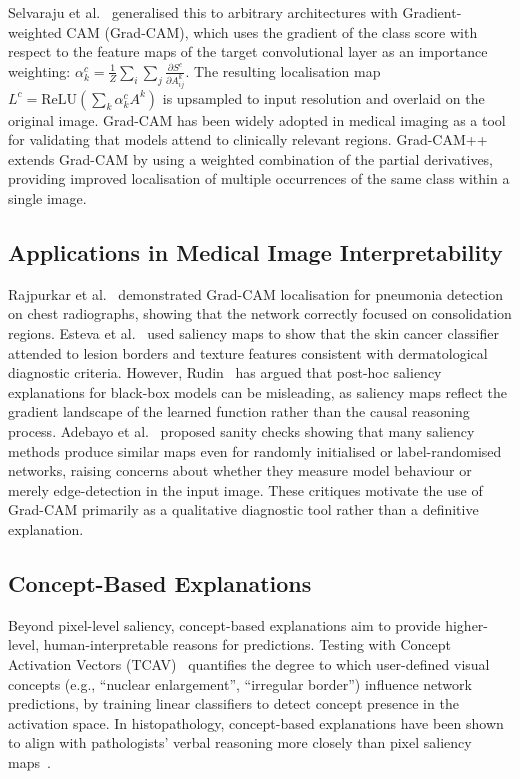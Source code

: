 Selvaraju et al.~\cite{selvaraju2017grad} generalised this to arbitrary architectures with Gradient-weighted CAM (Grad-CAM), which uses the gradient of the class score with respect to the feature maps of the target convolutional layer as an importance weighting: $\alpha_k^c = \frac{1}{Z}\sum_i \sum_j \frac{\partial S^c}{\partial A_{ij}^k}$. The resulting localisation map $L^c = \text{ReLU}\left(\sum_k \alpha_k^c A^k\right)$ is upsampled to input resolution and overlaid on the original image. Grad-CAM has been widely adopted in medical imaging as a tool for validating that models attend to clinically relevant regions. Grad-CAM++ \cite{chattopadhay2018grad} extends Grad-CAM by using a weighted combination of the partial derivatives, providing improved localisation of multiple occurrences of the same class within a single image.

\subsection{Applications in Medical Image Interpretability}

Rajpurkar et al.~\cite{rajpurkar2017chexnet} demonstrated Grad-CAM localisation for pneumonia detection on chest radiographs, showing that the network correctly focused on consolidation regions. Esteva et al.~\cite{esteva2017dermatologist} used saliency maps to show that the skin cancer classifier attended to lesion borders and texture features consistent with dermatological diagnostic criteria. However, Rudin~\cite{rudin2019stop} has argued that post-hoc saliency explanations for black-box models can be misleading, as saliency maps reflect the gradient landscape of the learned function rather than the causal reasoning process. Adebayo et al.~\cite{adebayo2018sanity} proposed sanity checks showing that many saliency methods produce similar maps even for randomly initialised or label-randomised networks, raising concerns about whether they measure model behaviour or merely edge-detection in the input image. These critiques motivate the use of Grad-CAM primarily as a qualitative diagnostic tool rather than a definitive explanation.

\subsection{Concept-Based Explanations}

Beyond pixel-level saliency, concept-based explanations aim to provide higher-level, human-interpretable reasons for predictions. Testing with Concept Activation Vectors (TCAV)~\cite{kim2018interpretability} quantifies the degree to which user-defined visual concepts (e.g., ``nuclear enlargement'', ``irregular border'') influence network predictions, by training linear classifiers to detect concept presence in the activation space. In histopathology, concept-based explanations have been shown to align with pathologists' verbal reasoning more closely than pixel saliency maps~\cite{lucieri2022explainability}.

